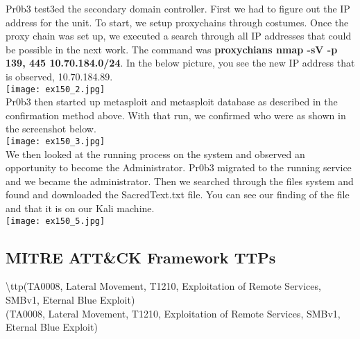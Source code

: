 \documentclass[notitlepage]{article}
\begin{document}
	\indent Pr0b3 test3ed the secondary domain controller. First we had to figure out the IP address for the unit. To start, we setup proxychains through costumes. Once the proxy chain was set up, we executed a search through all IP addresses that could be possible in the next work. The command was \textbf{proxychians nmap -sV -p 139, 445 10.70.184.0/24}. In the below picture, you see the new IP address that is observed, 10.70.184.89.  \\
		\texttt{[image: ex150\_2.jpg]} \\
	\indent Pr0b3 then started up metasploit and metasploit database as described in the confirmation method above.  With that run, we confirmed who were as shown in the screenshot below. \\
	\texttt{[image: ex150\_3.jpg]} \\
	\indent We then looked at the running process on the system and observed an opportunity to become the Administrator. Pr0b3 migrated to the running service and we became the administrator. Then we searched through the files system and found and downloaded the SacredText.txt file. You can see our finding of the file and that it is on our Kali machine.   \\
	\texttt{[image: ex150\_5.jpg]} \\

	

	
	
	
	\subsection{MITRE ATT{\&}CK Framework TTPs}
	
	\indent\textbackslash ttp(TA0008, Lateral Movement, T1210, Exploitation of Remote Services, SMBv1, Eternal Blue Exploit) \\
	\ttp(TA0008, Lateral Movement, T1210, Exploitation of Remote Services, SMBv1, Eternal Blue Exploit) \\
	
\end{document}
